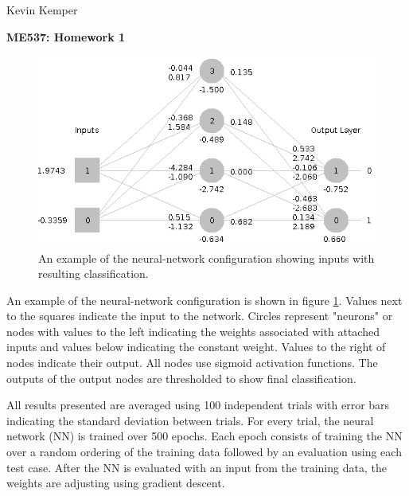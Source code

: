\documentclass[letterpaper, 11 pt]{article}
\author{Kevin Kemper}
\begin{document}
\begin{flushright}
Kevin Kemper
\end{flushright}

\vspace{-2cm}
\begin{center}
\textbf{\huge ME537: Homework 1}
\end{center}


\thispagestyle{empty}
\pagestyle{empty}



\begin{figure}
	\centering
	\includegraphics[scale=1.8]{../figures/Screenshot.png}
	\caption{\small	An example of the neural-network configuration showing inputs with
				resulting classification.
			}
	\label{fig:NNex}
\end{figure}

\vspace{0.5cm}
An example of the neural-network configuration is shown in figure \ref{fig:NNex}.
Values next to the squares indicate the input to the network.  Circles represent
"neurons" or nodes with values to the left indicating the weights associated
with attached inputs and values below indicating the constant weight.  Values to
the right of nodes indicate their output.  All nodes use sigmoid activation functions.
The outputs of the output nodes are thresholded to show final classification.

All results presented are averaged using 100 independent trials with error bars
indicating the standard deviation between trials. For every trial, the neural
network (NN) is trained over 500 epochs.  Each epoch consists of training the NN
over a random ordering of the training data followed by an evaluation using each
test case.  After the NN is evaluated with an input from the training data, the
weights are adjusting using gradient descent.
\end{document}
